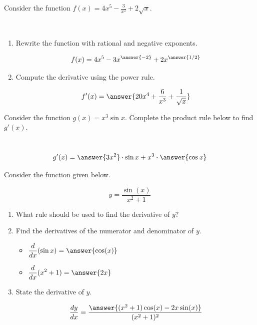 \documentclass{ximera}
\begin{document}
\begin{problem}
Consider the function $f(x) = 4x^5 - \frac{3}{x^2} + 2\sqrt{x}.$

~ \\[1em]

\begin{enumerate}
\item Rewrite the function with rational and negative exponents.

\[ f(x) = 4x^5 - 3x^{\answer{-2}} + 2x^{\answer{1/2}} \]

\item Compute the derivative using the power rule.

\[ f'(x) = \answer{20x^4 + \frac{6}{x^3} + \frac{1}{\sqrt{x}}}  \]

\end{enumerate}
\end{problem}


\begin{problem}
Consider the function $g(x) = x^3 \sin x.$  Complete the product rule below to find $g'(x).$

~ \\[1em] 

\[ g'(x) = \answer{3x^2} \cdot \sin x + x^3 \cdot \answer{\cos x} \] 

\end{problem}


\begin{problem}
Consider the function given below.

\[ y = \frac{\sin(x)}{x^2 + 1} \]


\begin{enumerate}
\item What rule should be used to find the derivative of $y?$


\begin{multipleChoice}
\end{multipleChoice}    


\item Find the derivatives of the numerator and denominator of $y.$

\begin{itemize}
    \item $\displaystyle \frac{d}{dx} (\sin x) = \answer{\cos(x)}$

    \item $\displaystyle \frac{d}{dx} (x^2+1) = \answer{2x}$
\end{itemize}


\item State the derivative of $y.$

\[ \frac{dy}{dx} = \frac{\answer{(x^2+1)\cos(x) - 2x\sin(x)}}{(x^2+1)^2} \]

\end{enumerate}
\end{problem}
\end{document}
